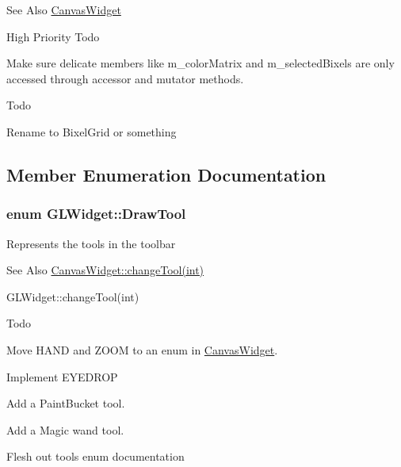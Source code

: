 \begin{DoxySeeAlso}{See Also}
\hyperlink{classCanvasWidget}{Canvas\-Widget} 
\end{DoxySeeAlso}
\begin{DoxyRefDesc}{High Priority Todo}
\item[\hyperlink{todo1__todo1000001}{High Priority Todo}]Make sure delicate members like m\-\_\-color\-Matrix and m\-\_\-selected\-Bixels are only accessed through accessor and mutator methods. \end{DoxyRefDesc}
\begin{DoxyRefDesc}{Todo}
\item[\hyperlink{todo__todo000010}{Todo}]Rename to Bixel\-Grid or something \end{DoxyRefDesc}


\subsection{Member Enumeration Documentation}
\hypertarget{classGLWidget_a9fba3eba78950865febd4547be0641d0}{
\subsubsection[{Draw\-Tool}]{\setlength{\rightskip}{0pt plus 5cm}enum {\bf G\-L\-Widget\-::\-Draw\-Tool}}}\label{classGLWidget_a9fba3eba78950865febd4547be0641d0}
Represents the tools in the toolbar \begin{DoxySeeAlso}{See Also}
\hyperlink{classCanvasWidget_a10d481976a36a4e489f42d2b5dfa4662}{Canvas\-Widget\-::change\-Tool(int)} 

G\-L\-Widget\-::change\-Tool(int) 
\end{DoxySeeAlso}
\begin{DoxyRefDesc}{Todo}
\item[\hyperlink{todo__todo000011}{Todo}]Move H\-A\-N\-D and Z\-O\-O\-M to an enum in \hyperlink{classCanvasWidget}{Canvas\-Widget}. 

Implement E\-Y\-E\-D\-R\-O\-P 

Add a Paint\-Bucket tool. 

Add a Magic wand tool. 

Flesh out tools enum documentation \end{DoxyRefDesc}
